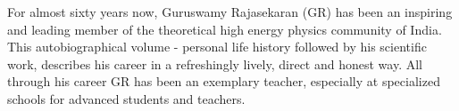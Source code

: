 \thispagestyle{empty}






\begin{figure}[H]
\end{figure}

For almost sixty years now, Guruswamy Rajasekaran (GR) has been an inspiring and leading member of the theoretical high energy  physics community of India. This autobiographical volume - personal life history followed by his scientific work, describes his career in a refreshingly lively, direct and honest way. All through his career GR has been an exemplary teacher, especially at specialized schools for advanced students and teachers.


~\thispagestyle{empty}
